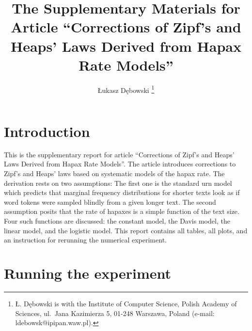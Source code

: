 \documentclass[a4paper,12pt]{article}
\title{The Supplementary Materials for Article ``Corrections of Zipf's
  and Heaps' Laws Derived from Hapax Rate Models''}
\author{{\L}ukasz D\k{e}bowski%
  \thanks{{\L}. D\k{e}bowski is with the Institute of Computer
    Science, Polish Academy of Sciences, ul.\ Jana Kazimierza 5,
    01-248 Warszawa, Poland (e-mail: ldebowsk@ipipan.waw.pl).}}
\date{}
\begin{document}
\maketitle


\section{Introduction}
\label{secIntroduction}

This is the supplementary report for article ``Corrections of Zipf's
and Heaps' Laws Derived from Hapax Rate Models''. The article
introduces corrections to Zipf's and Heaps' laws based on systematic
models of the hapax rate. The derivation rests on two assumptions: The
first one is the standard urn model which predicts that marginal
frequency distributions for shorter texts look as if word tokens were
sampled blindly from a given longer text. The second assumption posits
that the rate of hapaxes is a simple function of the text size. Four
such functions are discussed: the constant model, the Davis model, the
linear model, and the logistic model.  This report contains all
tables, all plots, and an instruction for rerunning the numerical
experiment.

\section{Running the experiment}
\end{document}
